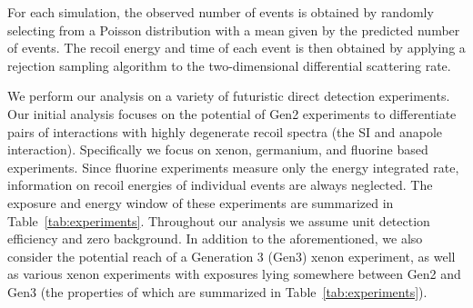\documentclass[11pt]{article}
\begin{document}
For each simulation, the observed number of events is obtained by randomly selecting from a Poisson distribution with a mean given by the predicted number of events. The recoil energy and time of each event is then obtained by applying a rejection sampling algorithm to the two-dimensional differential scattering rate. 

We perform our analysis on a variety of futuristic direct detection experiments. Our initial analysis focuses on the potential of Gen2 experiments to differentiate pairs of interactions with highly degenerate recoil spectra (\eg the SI and anapole interaction). Specifically we focus on xenon, germanium, and fluorine based experiments. Since fluorine experiments measure only the energy integrated rate, information on recoil energies of individual events are always neglected.  The exposure and energy window of these experiments are summarized in Table~\ref{tab:experiments}. Throughout our analysis we assume unit detection efficiency and zero background. In addition to the aforementioned, we also consider the potential reach of a Generation 3 (Gen3) xenon experiment, as well as various xenon experiments with exposures lying somewhere between Gen2 and Gen3 (the properties of which are summarized in Table~\ref{tab:experiments}).    
\end{document}
